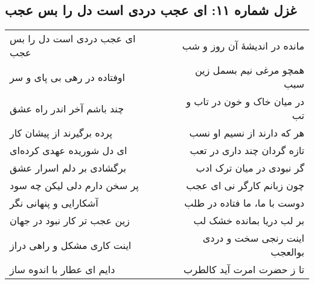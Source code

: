 \begin{center}
\section*{غزل شماره ۱۱: ای عجب دردی است دل را بس عجب}
\label{sec:011}
\begin{longtable}{l p{0.5cm} r}
ای عجب دردی است دل را بس عجب
&&
مانده در اندیشهٔ آن روز و شب
\\
اوفتاده در رهی بی پای و سر
&&
همچو مرغی نیم بسمل زین سبب
\\
چند باشم آخر اندر راه عشق
&&
در میان خاک و خون در تاب و تب
\\
پرده برگیرند از پیشان کار
&&
هر که دارند از نسیم او نسب
\\
ای دل شوریده عهدی کرده‌ای
&&
تازه گردان چند داری در تعب
\\
برگشادی بر دلم اسرار عشق
&&
گر نبودی در میان ترک ادب
\\
پر سخن دارم دلی لیکن چه سود
&&
چون زبانم کارگر نی ای عجب
\\
آشکارایی و پنهانی نگر
&&
دوست با ما، ما فتاده در طلب
\\
زین عجب تر کار نبود در جهان
&&
بر لب دریا بمانده خشک لب
\\
اینت کاری مشکل و راهی دراز
&&
اینت رنجی سخت و دردی بوالعجب
\\
دایم ای عطار با اندوه ساز
&&
تا ز حضرت امرت آید کالطرب
\\
\end{longtable}
\end{center}
